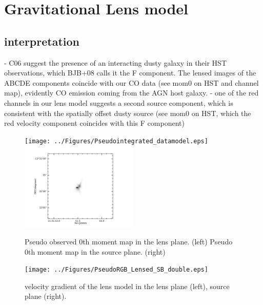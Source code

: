 \documentclass[]{emulateapj}
\begin{document}
\author{Draft}


\section{Gravitational Lens model}

\subsection{interpretation}
- C06 suggest the presence of an interacting dusty galaxy in their HST observations, which BJB+08 calls it the F component. The lensed images of the ABCDE components coincide with our CO data (see mom0 on HST and channel map), evidently CO emission coming from the AGN host galaxy. 
- one of the red channels in our lens model suggests a second source component, which is consistent with the spatially offset dusty source (see mom0 on HST, which the red velocity component coincides with this F component)




\begin{figure}[tbph]
\centering
\texttt{[image: ../Figures/Pseudointegrated\_datamodel.eps]}
\includegraphics[width=0.50\textwidth]{../Figures/SourcesPlane.png}
\caption{
Pseudo observed 0th moment map in the lens plane. (left)
Pseudo 0th moment map in the source plane. (right)
\label{fig:}}
\end{figure}




\begin{figure}[tbph]
\centering
\texttt{[image: ../Figures/PseudoRGB\_Lensed\_SB\_double.eps]}
\caption{
velocity gradient of the lens model in the lens plane (left), source plane (right).
\label{fig:}}
\end{figure}


\end{document}
